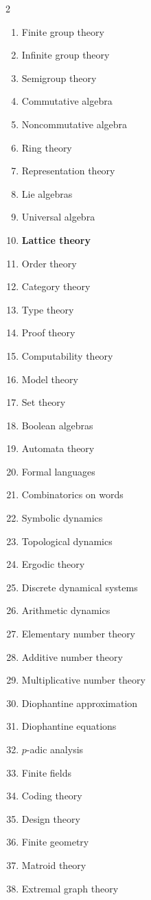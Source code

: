 \documentclass[11pt,a4paper]{article}
\numberwithin{equation}{section}
\theoremstyle{definition}
\theoremstyle{remark}
\begin{document}
\begin{multicols}{2}
\small
\begin{enumerate}[leftmargin=2.6em,itemsep=0pt,parsep=0pt,topsep=0pt]
\item Finite group theory
\item Infinite group theory
\item Semigroup theory
\item Commutative algebra
\item Noncommutative algebra
\item Ring theory
\item Representation theory
\item Lie algebras
\item Universal algebra
\item \textbf{Lattice theory}
\item Order theory
\item Category theory
\item Type theory
\item Proof theory
\item Computability theory
\item Model theory
\item Set theory
\item Boolean algebras
\item Automata theory
\item Formal languages
\item Combinatorics on words
\item Symbolic dynamics
\item Topological dynamics
\item Ergodic theory
\item Discrete dynamical systems
\item Arithmetic dynamics
\item Elementary number theory
\item Additive number theory
\item Multiplicative number theory
\item Diophantine approximation
\item Diophantine equations
\item $p$-adic analysis
\item Finite fields
\item Coding theory
\item Design theory
\item Finite geometry
\item Matroid theory
\item Extremal graph theory

\end{enumerate}
\end{multicols}
\end{document}
